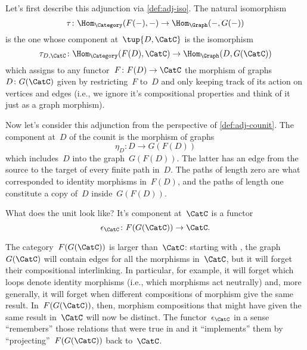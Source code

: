 Let's first describe this adjunction via \cref{def:adj-iso}. The natural isomorphism
\begin{equation*}
  \tau\colon \Hom_{\Category}(F(- ), - ) \to \Hom_{\Graph}(- , G( - ))
\end{equation*}
is the one whose component at~$\tup{D,\CatC}$ is the isomorphism
\begin{equation*}
  \tau_{D,\CatC} \colon \Hom_{\Category}(F(D), \CatC) \to \Hom_{\Graph}(D, G(\CatC))
\end{equation*}
which assigns to any functor~$F\colon F(D) \to \CatC$ the morphism of graphs~$D \colon G(\CatC)$ given by restricting~$F$ to~$D$ and only keeping track of its action on vertices and edges (i.e., we ignore it's compositional properties and think of it just as a graph morphism).

Now let's consider this adjunction from the perspective of \cref{def:adj-counit}. The component at~$D$ of the counit is the morphism of graphs
\begin{equation*}
  \eta_D \colon D \to  G(F(D))
\end{equation*}
which includes~$D$ into the graph~$G(F(D))$. The latter has an edge from the source to the target of every finite path in~$D$. The paths of length zero are what corresponded to identity morphisms in~$F(D)$, and the paths of length one constitute a copy of~$D$ inside~$G(F(D))$.

What does the unit look like? It's component at~$\CatC$ is a functor
\begin{equation*}
  \epsilon_{\CatC} \colon F(G(\CatC)) \to \CatC.
\end{equation*}

The category~$F(G(\CatC))$ is larger than~$\CatC$: starting with \CatC, the graph~$G(\CatC)$ will contain edges for all the morphisms in~$\CatC$, but it will forget their compositional interlinking. In particular, for example, it will forget which loops denote identity morphisms (i.e., which morphisms act neutrally) and, more generally, it will forget when different compositions of morphism give the same result. In~$F(G(\CatC))$, then, morphism compositions that might have given the same result in~$\CatC$ will now be distinct.
The functor~$\epsilon_{\CatC}$ in a sense ``remembers'' those relations that were true in \CatC and it ``implements'' them by ``projecting''~$F(G(\CatC))$ back to~$\CatC$.

